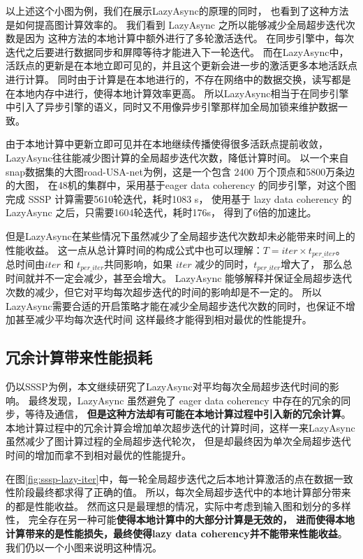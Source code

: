 以上述这个小图为例，我们在展示LazyAsync的原理的同时，
也看到了这种方法是如何提高图计算效率的。
我们看到 LazyAsync 之所以能够减少全局超步迭代次数是因为
这种方法的本地计算中额外进行了多轮激活迭代。
在同步引擎中，每次迭代之后要进行数据同步和屏障等待才能进入下一轮迭代。
而在LazyAsync中，活跃点的更新是在本地立即可见的，并且这个更新会进一步的激活更多本地活跃点进行计算。
同时由于计算是在本地进行的，不存在网络中的数据交换，读写都是在本地内存中进行，使得本地计算效率更高。
所以LazyAsync相当于在同步引擎中引入了异步引擎的语义\cite{Ju@MACS17}，同时又不用像异步引擎那样加全局加锁来维护数据一致\cite{Xie@PPoPP15}。

由于本地计算中更新立即可见并在本地继续传播使得很多活跃点提前收敛，LazyAsync往往能减少图计算的全局超步迭代次数，降低计算时间。
以一个来自snap\cite{SNAP}数据集的大图road-USA-net为例，这是一个包含 2400 万个顶点和5800万条边的大图，
在48机的集群中，采用基于eager data coherency 的同步引擎，对这个图完成 SSSP 计算需要5610轮迭代，耗时1083 s， 
使用基于 lazy data coherency 的 LazyAsync 之后，只需要1604轮迭代，耗时176s，
得到了6倍的加速比。

但是LazyAsync在某些情况下虽然减少了全局超步迭代次数却未必能带来时间上的性能收益。
这一点从总计算时间的构成公式\cite{bsp@1990}中也可以理解：$T=iter \times t_{per\_iter}$。
总时间由$iter$ 和 $t_{per\_iter}$共同影响，如果 $iter$ 减少的同时，$t_{per\_iter}$增大了，
那么总时间就并不一定会减少，甚至会增大。
LazyAsync 能够解释并保证全局超步迭代次数的减少，但它对平均每次超步迭代的时间的影响却是不一定的。
所以LazyAsync需要合适的开启策略才能在减少全局超步迭代次数的同时，也保证不增加甚至减少平均每次迭代时间
这样最终才能得到相对最优的性能提升。

\subsection{冗余计算带来性能损耗}
仍以SSSP为例，本文继续研究了LazyAsync对平均每次全局超步迭代时间的影响。
最终发现，LazyAsync 虽然避免了 eager data coherency 中存在的冗余的同步，等待及通信，
\textbf{但是这种方法却有可能在本地计算过程中引入新的冗余计算}。
本地计算过程中的冗余计算会增加单次超步迭代的计算时间，这样一来LazyAsync虽然减少了图计算过程的全局超步迭代轮次，
但是却最终因为单次全局超步迭代时间的增加而拿不到相对最优的性能提升。


在图\ref{fig:sssp-lazy-iter}中，每一轮全局超步迭代之后本地计算激活的点在数据一致性阶段最终都求得了正确的值。
所以，每次全局超步迭代中的本地计算部分带来的都是性能收益。
然而这只是最理想的情况，实际中考虑到输入图和划分的多样性，
完全存在另一种可能\textbf{使得本地计算中的大部分计算是无效的，
进而使得本地计算带来的是性能损失，最终使得lazy data coherency并不能带来性能收益}。
我们仍以一个小图来说明这种情况。


